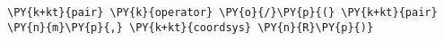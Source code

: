 \begin{Verbatim}[commandchars=\\\{\}]
    \PY{k+kt}{pair} \PY{k}{operator} \PY{o}{/}\PY{p}{(} \PY{k+kt}{pair} \PY{n}{m}\PY{p}{,} \PY{k+kt}{coordsys} \PY{n}{R}\PY{p}{)}
\end{Verbatim}
